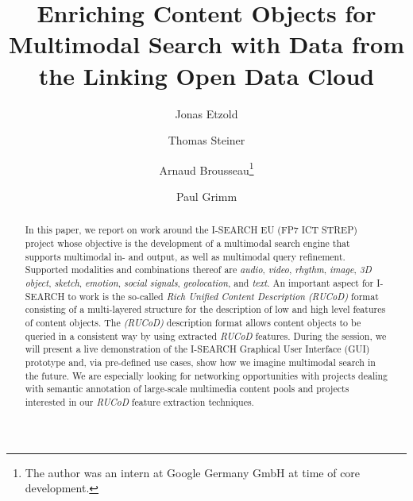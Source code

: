 \documentclass[runningheads,a4paper]{llncs}
\begin{document}
\mainmatter

\title{Enriching Content Objects for Multimodal Search with Data from the Linking Open Data Cloud}

\author{Jonas Etzold \and Thomas Steiner \and Arnaud Brousseau\thanks{The author was an intern at Google Germany GmbH at time of core development.} \and Paul Grimm}


\maketitle

\begin{abstract}
In this paper, we report on work around the \mbox{I-SEARCH} EU (FP7 ICT STREP) project
whose objective is the development of a multimodal search engine that supports multimodal
in- and output, as well as multimodal  query refinement.
Supported modalities and combinations thereof are \emph{audio}, \emph{video},
\emph{rhythm}, \emph{image}, \emph{3D object}, \emph{sketch}, \emph{emotion},
\emph{social signals}, \emph{geolocation}, and \emph{text}.
An important aspect for \mbox{I-SEARCH} to work is the so-called
\emph{Rich Unified Content Description} \emph{\mbox{(RUCoD)}} format
consisting of a multi-layered structure
for the description of low and high level features of content objects.
The \emph{\mbox{(RUCoD)}} description format allows content objects
to be queried in a consistent way by using extracted \mbox{\emph{RUCoD}} features.
During the session, we will present a live demonstration of the \mbox{I-SEARCH}
Graphical User Interface (GUI) prototype and, via pre-defined use cases,
show how we imagine multimodal search in the future.
We are especially looking for networking opportunities with projects dealing with
semantic annotation of large-scale multimedia content pools and 
projects interested in our \emph{RUCoD} feature extraction techniques.
\end{abstract}
\end{document}
